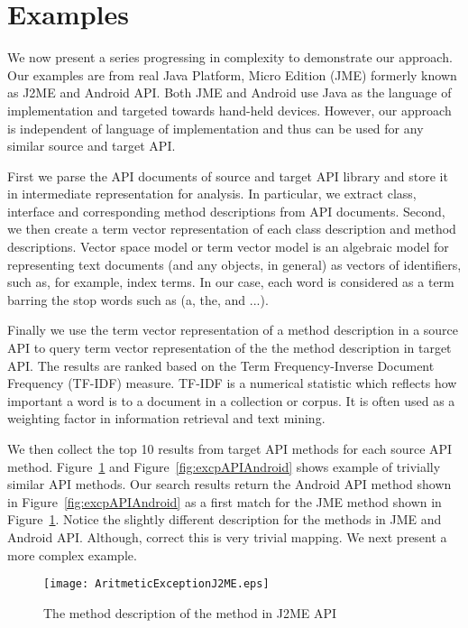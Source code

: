 \section{Examples}
\label{sec:example}

We now present a series progressing in complexity to demonstrate our approach. Our examples are from real Java Platform, Micro Edition (JME) formerly known as J2ME and Android API. Both JME and Android use Java as the language of implementation and targeted towards hand-held devices. However, our approach is independent of language of implementation and thus can be used for any similar source and target API.  

First we parse the API documents of source and target API library and store it in intermediate representation for analysis. In particular, we extract class, interface and corresponding method descriptions from API documents. Second, we then create a term vector representation of each class description and method descriptions. Vector space model or term vector model is an algebraic model for representing text documents (and any objects, in general) as vectors of identifiers, such as, for example, index terms. In our case, each word is considered as a term barring the stop words such as (a, the, and ...). 

Finally we use the term vector representation of a method description in a source API to query term vector representation of the the method description in target API. The results are ranked based on the Term Frequency-Inverse Document Frequency (TF-IDF) measure. TF-IDF is a numerical statistic which reflects how important a word is to a document in a collection or corpus. It is often used as a weighting factor in information retrieval and text mining.

We then collect the top 10 results from target API methods for each source API method. Figure~\ref{fig:excpAPIJ2ME} and Figure~\ref{fig:excpAPIAndroid} shows example of trivially similar API methods. Our search results return the Android API method shown in Figure~\ref{fig:excpAPIAndroid} as a first match for the JME method shown in Figure~\ref{fig:excpAPIJ2ME}. Notice the slightly different description for the methods in JME and Android API. Although, correct this is very trivial mapping. We next present a more complex example.  

\begin{figure}[t]
\begin{CodeOut}
\begin{alltt}
\texttt{[image: AritmeticExceptionJ2ME.eps]}
\end{alltt}
\end{CodeOut}
\caption{\label{fig:excpAPIJ2ME} The method description of the  method in J2ME API}
\end{figure}



